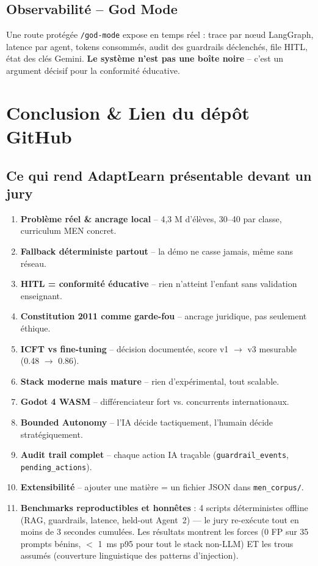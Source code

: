 \documentclass[11pt,a4paper]{article}
\begin{document}
\subsection{Observabilité -- God Mode}

Une route protégée \texttt{/god-mode} expose en temps réel : trace par nœud LangGraph,
latence par agent, tokens consommés, audit des guardrails déclenchés, file HITL,
état des clés Gemini. \textbf{Le système n'est pas une boîte noire} -- c'est un
argument décisif pour la conformité éducative.

\newpage

\section{Conclusion \& Lien du dépôt GitHub}

\subsection{Ce qui rend AdaptLearn présentable devant un jury}

\begin{enumerate}
\item \textbf{Problème réel \& ancrage local} -- 4,3 M d'élèves, 30--40 par classe, curriculum MEN concret.
\item \textbf{Fallback déterministe partout} -- la démo ne casse jamais, même sans réseau.
\item \textbf{HITL = conformité éducative} -- rien n'atteint l'enfant sans validation enseignant.
\item \textbf{Constitution 2011 comme garde-fou} -- ancrage juridique, pas seulement éthique.
\item \textbf{ICFT vs fine-tuning} -- décision documentée, score v1 $\rightarrow$ v3 mesurable (0.48 $\rightarrow$ 0.86).
\item \textbf{Stack moderne mais mature} -- rien d'expérimental, tout scalable.
\item \textbf{Godot 4 WASM} -- différenciateur fort vs. concurrents internationaux.
\item \textbf{Bounded Autonomy} -- l'IA décide tactiquement, l'humain décide stratégiquement.
\item \textbf{Audit trail complet} -- chaque action IA traçable (\texttt{guardrail\_events}, \texttt{pending\_actions}).
\item \textbf{Extensibilité} -- ajouter une matière = un fichier JSON dans \texttt{men\_corpus/}.
\item \textbf{Benchmarks reproductibles et honnêtes} : 4 scripts
      déterministes offline (RAG, guardrails, latence, held-out Agent~2)
      --- le jury re-exécute tout en moins de 3 secondes cumulées. Les
      résultats montrent les forces (0 FP sur 35 prompts bénins, $<$ 1~ms
      p95 pour tout le stack non-LLM) ET les trous assumés (couverture
      linguistique des patterns d'injection).
\end{enumerate}
\end{document}
